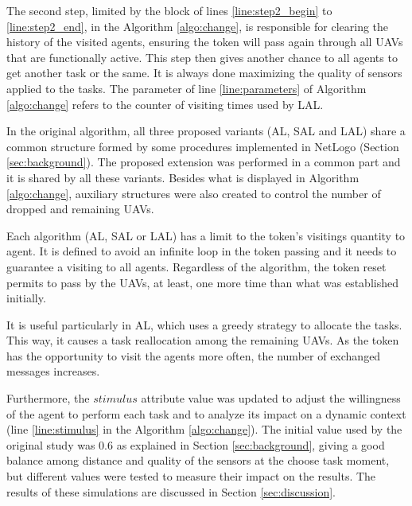 The second step, limited by the block of lines \ref{line:step2_begin} to \ref{line:step2_end}, in the Algorithm \ref{algo:change}, is responsible for clearing the history of the visited agents, ensuring the token will pass again through all UAVs that are functionally active. This step then gives another chance to all agents to get another task or the same. It is always done maximizing the quality of sensors applied to the tasks. The parameter of line \ref{line:parameters} of Algorithm \ref{algo:change} refers to the counter of visiting times used by LAL.

In the original algorithm, all three proposed variants (AL, SAL and LAL) share a common structure formed by some procedures implemented in NetLogo (Section \ref{sec:background}). The proposed extension was performed in a common part and it is shared by all these variants. Besides what is displayed in Algorithm \ref{algo:change}, auxiliary structures were also created to control the number of dropped and remaining UAVs.

Each algorithm (AL, SAL or LAL) has a limit to the token's visitings quantity to agent. It is defined to avoid an infinite loop in the token passing and it needs to guarantee a visiting to all agents. Regardless of the algorithm, the token reset permits to pass by the UAVs, at least, one more time than what was established initially. 

It is useful particularly in AL, which uses a greedy strategy to allocate the tasks. This way, it causes a task reallocation among the remaining UAVs. As the token has the opportunity to visit the agents more often, the number of exchanged messages increases.

Furthermore, the $stimulus$ attribute value was updated to adjust the willingness of the agent to perform each task and to analyze its impact on a dynamic context (line \ref{line:stimulus} in the Algorithm \ref{algo:change}). The initial value used by the original study was $0.6$ as explained in Section \ref{sec:background}, giving a good balance among distance and quality of the sensors at the choose task moment, but different values were tested to measure their impact on the results. The results of these simulations are discussed in Section \ref{sec:discussion}. 